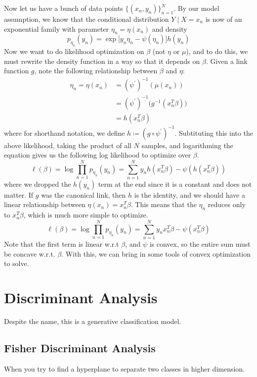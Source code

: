 \documentclass{article}
\theoremstyle{definition}
\begin{document}
  Now let us have a bunch of data points $\{(x_n, y_n)\}_{n=1}^N$. By our model assumption, we know that the conditional distribution $Y \mid X = x_n$ is now of an exponential family with parameter $\eta_n = \eta (x_n)$ and density 
  \[p_{\eta_n} (y_n) = \exp \big[ y_n \eta_n - \psi(\eta_n) \big] h(y_n)\]
  Now we want to do likelihood optimization on $\beta$ (not $\eta$ or $\mu$), and to do this, we must rewrite the density function in a way so that it depends on $\beta$. Given a link function $g$, note the following relationship between $\beta$ and $\eta$: 
  \begin{align*}
      \eta_n = \eta (x_n) & = (\psi^\prime)^{-1} (\mu (x_n)) \\
      & = (\psi^{\prime})^{-1} \big( g^{-1} (x_n^T \beta )\big) \\
      & = h(x_n^T \beta) 
  \end{align*}
  where for shorthand notation, we define $h \coloneqq (g \circ \psi^\prime)^{-1}$. Subtituting this into the above likelihood, taking the product of all $N$ samples, and logarithming the equation gives us the following log likelihood to optimize over $\beta$. 
  \[\ell(\beta) = \log \prod_{n=1}^N p_{\eta_n} (y_n) = \sum_{n=1}^N y_n h(x_n^T \beta)  - \psi(h(x_n^T \beta) )\]
  where we dropped the $h(y_n)$ term at the end since it is a constant and does not matter. If $g$ was the canonical link, then $h$ is the identity, and we should have a linear relationship between $\eta (x_n) = x_n^T \beta$. This means that the $\eta_n$ reduces only to $x_n^T \beta$, which is much more simple to optimize. 
  \[\ell(\beta) = \log \prod_{n=1}^N p_{\eta_n} (y_n) = \sum_{n=1}^N y_n x_n^T \beta - \psi(x_n^T \beta)\]
  Note that the first term is linear w.r.t $\beta$, and $\psi$ is convex, so the entire sum must be concave w.r.t. $\beta$. With this, we can bring in some tools of convex optimization to solve. 

\section{Discriminant Analysis}

  Despite the name, this is a generative classification model. 

  \subsection{Fisher Discriminant Analysis}

  When you try to find a hyperplane to separate two classes in higher dimension. 
\end{document}
